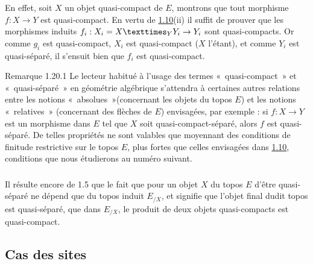 \documentclass[10pt]{../fichiers-configuration-latex/smfart}
\begin{document}
En effet, soit $X$ un objet quasi-compact de $E$, montrons que tout
morphisme $f : X \to Y$ est quasi-compact. En vertu de \hyperref[VI.prop1.10]{1.10}(ii) il
suffit de prouver que les morphismes induits $f_i : X_i =
\fprod{X}{Y_i}{Y} \to Y_i$ sont quasi-compacts. Or comme $g_i$ est
quasi-compact, $X_i$ est quasi-compact ($X$ l'étant), et comme $Y_i$
est quasi-séparé, il s'ensuit bien que $f_i$ est quasi-compact.

\begin{enonce*}[remark]{Remarque 1.20.1}
Le lecteur habitué à l'usage des termes « quasi-compact » et « quasi-séparé » en géométrie algébrique s'attendra à certaines
autres relations entre les notions « absolues »(concernant les
objets du topos $E$) et les notions « relatives » (concernant
des flèches de $E$) envisagées, par exemple : si $f: X \to Y$ est un
morphisme dans $E$ tel que $X$ soit quasi-compact-séparé, alors $f$
est quasi-séparé. De telles propriétés ne sont valables que
moyennant des conditions de finitude restrictive sur le topos $E$,
plus fortes que celles envisagées dans \hyperref[VI.prop1.10]{1.10}, conditions
que nous étudierons au numéro suivant.
\end{enonce*}

\setcounter{subsection}{20}
\setcounter{subsubsection}{1}
\subsubsection{}
Il résulte encore de 1.5 que le fait que pour un objet $X$ du topos
$E$ d'être quasi-séparé ne dépend que du topos induit $E_{/X}$, et
signifie que l'objet final dudit topos est quasi-séparé, \ie que
dans $E_{/X}$, le produit de deux objets quasi-compacts est
quasi-compact.

\subsection{Cas des sites}\pageoriginale
\end{document}
